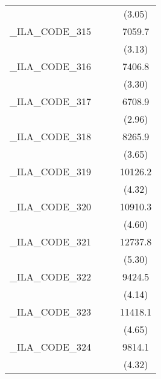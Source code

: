 {\begin{tabular}{l*{3}{c}}
            &                     &                     &      (3.05)         \\
[1em]
\_ILA\_CODE\_315&                     &                     &      7059.7\sym{**} \\
            &                     &                     &      (3.13)         \\
[1em]
\_ILA\_CODE\_316&                     &                     &      7406.8\sym{***}\\
            &                     &                     &      (3.30)         \\
[1em]
\_ILA\_CODE\_317&                     &                     &      6708.9\sym{**} \\
            &                     &                     &      (2.96)         \\
[1em]
\_ILA\_CODE\_318&                     &                     &      8265.9\sym{***}\\
            &                     &                     &      (3.65)         \\
[1em]
\_ILA\_CODE\_319&                     &                     &     10126.2\sym{***}\\
            &                     &                     &      (4.32)         \\
[1em]
\_ILA\_CODE\_320&                     &                     &     10910.3\sym{***}\\
            &                     &                     &      (4.60)         \\
[1em]
\_ILA\_CODE\_321&                     &                     &     12737.8\sym{***}\\
            &                     &                     &      (5.30)         \\
[1em]
\_ILA\_CODE\_322&                     &                     &      9424.5\sym{***}\\
            &                     &                     &      (4.14)         \\
[1em]
\_ILA\_CODE\_323&                     &                     &     11418.1\sym{***}\\
            &                     &                     &      (4.65)         \\
[1em]
\_ILA\_CODE\_324&                     &                     &      9814.1\sym{***}\\
            &                     &                     &      (4.32)         \\

\end{tabular}}
